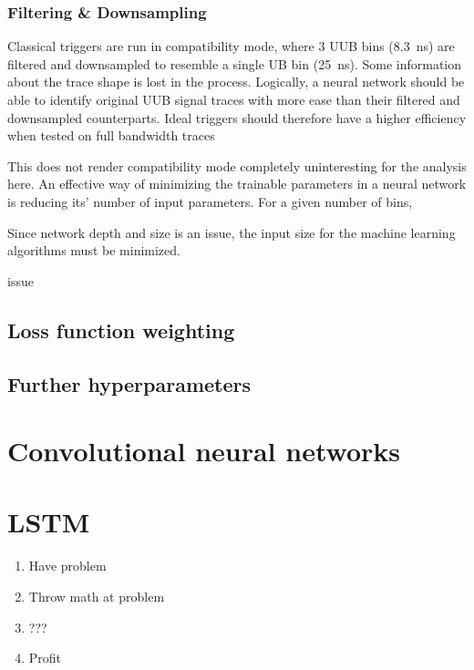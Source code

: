 \subsubsection{Filtering \& Downsampling}
\label{sssec:filtering-and-downsampling}

Classical triggers are run in compatibility mode, where 3 UUB bins (\SI{8.3}{\nano\second}) are filtered and downsampled to resemble a single UB bin 
(\SI{25}{\nano\second}). Some information about the trace shape is lost in the process. Logically, a neural network should be able to identify original UUB signal 
traces with more ease than their filtered and downsampled counterparts. Ideal triggers should therefore have a higher efficiency when tested on full bandwidth 
traces

This does not render compatibility mode completely uninteresting for the analysis here. An effective way of minimizing the trainable parameters in a neural network
is reducing its' number of input parameters. For a given number of bins, 


Since network depth and size is an issue, the input size for the machine 
learning algorithms must be minimized. 

issue

\subsection{Loss function weighting}
\label{ssec:loss-function-weighting}



\subsubsection{}

\subsection{Further hyperparameters}
\label{ssec:hyperparameters}





\section{Convolutional neural networks}


\section{LSTM}

\begin{enumerate}
    \item Have problem
    \item Throw math at problem
    \item ???
    \item Profit
\end{enumerate}

